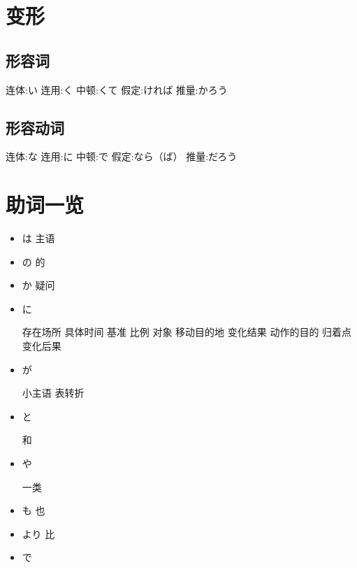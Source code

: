     \section{变形}
        \subsection{形容词}
        连体:い 连用:く 中顿:くて 假定:ければ 推量:かろう
        \subsection{形容动词}
        连体:な 连用:に 中顿:で 假定:なら（ば） 推量:だろう
    \section{助词一览}
    \begin{itemize}
        \item は
                主语
        \item の
                的
        \item か
                疑问
        \item に

                存在场所
                具体时间
                基准
                比例
                对象
                移动目的地
                变化结果
                动作的目的
                归着点
                变化后果
        \item が

                小主语
                表转折
        \item と

                和
        \item や

                一类
        \item も
                也
        \item より
                比
        \item で


\end{itemize}
